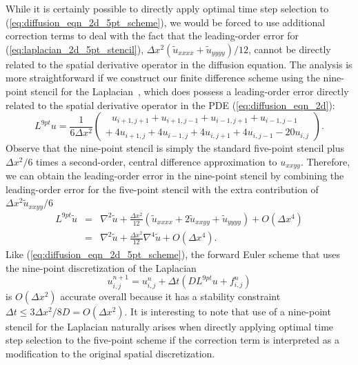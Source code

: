 \documentclass[fleqn,12pt,twoside]{article}
\newcommand{\beq}{\begin{equation}}
\newcommand{\eeq}{\end{equation}}
\newcommand{\bea}{\begin{eqnarray}}
\newcommand{\eea}{\end{eqnarray}}
\def\tu{\tilde{u}}
\def\dt{\Delta t}
\def\dx{\Delta x}
\begin{document}
While it is certainly possible to directly apply optimal time step selection 
to (\ref{eq:diffusion_eqn_2d_5pt_scheme}), we would be forced to use additional
correction terms to deal with the fact that the leading-order error for 
(\ref{eq:laplacian_2d_5pt_stencil}), 
$\dx^2 \left(\tu_{xxxx} + \tu_{yyyy}\right)/12$, cannot be directly related 
to the spatial derivative operator in the diffusion equation.  
The analysis is more straightforward if we construct our finite difference 
scheme using the nine-point stencil for the 
Laplacian~\cite{iserles_book,patra_2005}, which does possess a leading-order 
error directly related to the spatial derivative operator in the PDE 
(\ref{eq:diffusion_eqn_2d}):
\beq
  L^{9pt} u = \frac{1}{6 \dx^2} \left( 
      \begin{array}{l}
         \ \ \ u_{i+1,j+1} + u_{i+1,j-1}
            + u_{i-1,j+1} + u_{i-1,j-1} \\
         +\ 4 u_{i+1,j} + 4 u_{i-1,j}
           + 4 u_{i,j+1} + 4 u_{i,j-1}
           -20 u_{i,j} 
      \end{array}
    \right). 
  \label{eq:laplacian_2d_9pt_stencil}
\eeq
Observe that the nine-point stencil is simply the standard five-point 
stencil plus $\dx^2/6$ times a second-order, central difference 
approximation to $u_{xxyy}$.  Therefore, we can obtain the leading-order 
error in the nine-point stencil by combining the leading-order error for the 
five-point stencil with the extra contribution of 
$\dx^2 \tu_{xxyy}/6$
\bea
L^{9pt} \tu &=& \nabla^2 \tu 
              + \frac{\dx^2}{12} 
                \left(\tu_{xxxx} + 2 \tu_{xxyy} + \tu_{yyyy}\right)
              + O(\dx^4)
          \nonumber \\
          &=& \nabla^2 \tu + \frac{\dx^2}{12} \nabla^4 \tu + O(\dx^4).
  \label{eq:laplacian_2d_9pt_stencil_error}
\eea
Like (\ref{eq:diffusion_eqn_2d_5pt_scheme}), the forward Euler scheme that 
uses the nine-point discretization of the Laplacian 
\beq
  u^{n+1}_{i,j} = u^{n}_{i,j}
  + \dt \left( D L^{9pt} u + f_{i,j}^n \right)
  \label{eq:diffusion_eqn_2d_9pt_scheme}
\eeq
is $O(\dx^2)$ accurate overall because it has a stability constraint 
$\dt \le 3\dx^2/8D = O(\dx^2)$.
It is interesting to note that use of a nine-point stencil for the Laplacian 
naturally arises when directly applying optimal time step selection to the
five-point scheme if the correction term is interpreted as a modification 
to the original spatial discretization.
\end{document}
